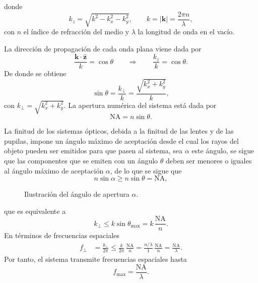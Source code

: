 \documentclass[12pt,a4paper]{article}
\numberwithin{equation}{section}
\begin{document}
donde
\begin{equation}
k_z = \sqrt{k^2 - k_x^2 - k_y^2},
\qquad
k = \lvert\mathbf k\rvert = \frac{2\pi n}{\lambda},
\end{equation}
con \(n\) el índice de refracción del medio y \(\lambda\) la longitud de onda en el vacío.

La dirección de propagación de cada onda plana viene dada por
\begin{equation}
\frac{\mathbf k\cdot\hat{\mathbf z}}{k} = \cos\theta
\qquad\Rightarrow\qquad
\frac{k_z}{k} = \cos\theta.
\end{equation}
De donde se obtiene
\begin{equation}
\sin\theta
= \frac{k_\perp}{k}
= \frac{\sqrt{k_x^2 + k_y^2}}{k},
\end{equation}
con \(k_\perp = \sqrt{k_x^2 + k_y^2}\).
La apertura numérica del sistema está dada por \cite{bornwolf1999}
\begin{equation}
\mathrm{NA} = n \sin\theta.
\label{eq:def_NA}
\end{equation}

La finitud de los sistemas ópticos, debida a la finitud de las lentes y de las pupilas, impone
un ángulo máximo de aceptación desde el cual los rayos del objeto pueden ser emitidos para que pasen al sistema, 
sea $\alpha$ este ángulo, se sigue que las componentes que se emiten con un ángulo $\theta$ deben ser menores o iguales al ángulo máximo de aceptación $\alpha$, de lo que se sigue que
\begin{equation}
n\sin\alpha \ge n\sin\theta = \mathrm{NA},
\end{equation}

\begin{figure}[H]
    \centering
    
    \caption{Ilustración del ángulo de apertura $\alpha$.}
    \label{fig:na_geometry}
\end{figure}
que es equivalente a
\begin{equation}
k_\perp \le k \sin\theta_{\max}
= k\,\frac{\mathrm{NA}}{n}.
\end{equation}
En términos de frecuencias espaciales
\begin{equation}
\begin{aligned}
f_\perp &= \frac{k_\perp}{2\pi}
\le \frac{k}{2\pi}\,\frac{\mathrm{NA}}{n}
= \frac{n/\lambda}{1}\,\frac{\mathrm{NA}}{n}
= \frac{\mathrm{NA}}{\lambda}.
\end{aligned}
\end{equation}
Por tanto, el sistema transmite frecuencias espaciales hasta
\begin{equation}
f_{\max} = \frac{\mathrm{NA}}{\lambda}.
\end{equation}
\end{document}
